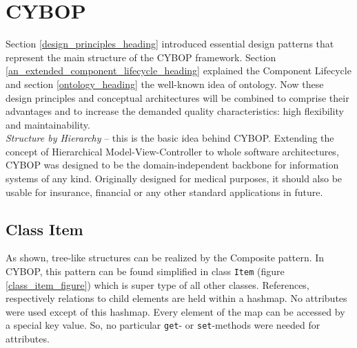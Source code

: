 %
%
%
%
%
%
%

\section{CYBOP}
\label{cybop_heading}

Section \ref{design_principles_heading} introduced essential design patterns
that represent the main structure of the CYBOP framework. Section
\ref{an_extended_component_lifecycle_heading} explained the Component Lifecycle
and section \ref{ontology_heading} the well-known idea of ontology. Now these
design principles and conceptual architectures will be combined to comprise
their advantages and to increase the demanded quality characteristics: high
flexibility and maintainability.\\
\emph{Structure by Hierarchy} -- this is the basic idea behind CYBOP. Extending
the concept of Hierarchical Model-View-Controller to whole software architectures,
CYBOP was designed to be the domain-independent backbone for information systems
of any kind. Originally designed for medical purposes, it should also be usable
for insurance, financial or any other standard applications in future.

\subsection{Class Item}
\label{class_item_heading}

As shown, tree-like structures can be realized by the Composite pattern. In
CYBOP, this pattern can be found simplified in class {\tt Item} (figure
\ref{class_item_figure}) which is super type of all other classes. References,
respectively relations to child elements are held within a hashmap. No attributes
were used except of this hashmap. Every element of the map can be accessed by a
special key value. So, no particular {\tt get}- or {\tt set}-methods were needed
for attributes.


